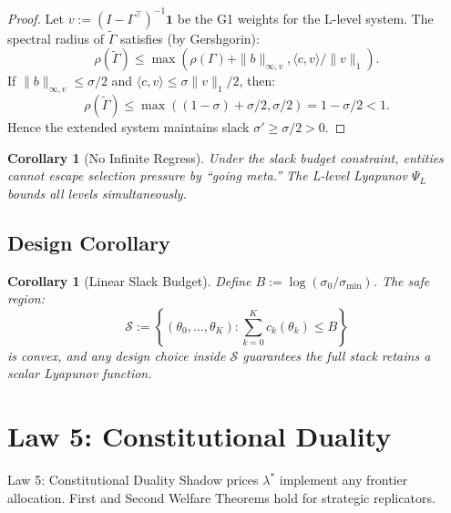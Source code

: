 \documentclass[12pt]{article}
\newtheorem{corollary}[theorem]{Corollary}
\begin{document}
\begin{proof}
Let $v := (I - \Gamma^\top)^{-1} \mathbf{1}$ be the G1 weights for the L-level system. The spectral radius of $\tilde{\Gamma}$ satisfies (by Gershgorin):
\[
\rho(\tilde{\Gamma}) \leq \max\left( \rho(\Gamma) + \|b\|_{\infty, v}, \langle c, v \rangle / \|v\|_1 \right).
\]
If $\|b\|_{\infty, v} \leq \sigma/2$ and $\langle c, v \rangle \leq \sigma \|v\|_1 / 2$, then:
\[
\rho(\tilde{\Gamma}) \leq \max\left( (1 - \sigma) + \sigma/2, \sigma/2 \right) = 1 - \sigma/2 < 1.
\]
Hence the extended system maintains slack $\sigma' \geq \sigma/2 > 0$.
\end{proof}

\begin{corollary}[No Infinite Regress]
\label{cor:no-regress}
Under the slack budget constraint, entities cannot escape selection pressure by ``going meta.'' The L-level Lyapunov $\Psi_L$ bounds all levels simultaneously.
\end{corollary}

\subsection{Design Corollary}

\begin{corollary}[Linear Slack Budget]
\label{cor:linear-budget}
Define $B := \log(\sigma_0 / \sigma_{\min})$. The safe region:
\[
\mathcal{S} := \left\{ (\theta_0, \ldots, \theta_K) : \sum_{k=0}^K c_k(\theta_k) \leq B \right\}
\]
is convex, and any design choice inside $\mathcal{S}$ guarantees the full stack retains a scalar Lyapunov function.
\end{corollary}




\section{Law 5: Constitutional Duality}
\label{sec:law5}

\begin{lawbox}{Law 5: Constitutional Duality}
Shadow prices $\lambda^*$ implement any frontier allocation. First and Second Welfare Theorems hold for strategic replicators.
\end{lawbox}
\end{document}
